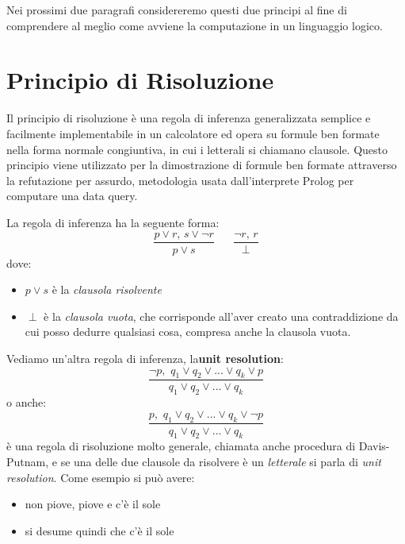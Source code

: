 Nei prossimi due paragrafi considereremo questi due principi al fine di comprendere al meglio come avviene la computazione in un linguaggio logico.
\section{Principio di Risoluzione}
Il principio di risoluzione è una regola di inferenza generalizzata semplice e facilmente implementabile in un calcolatore
ed opera su formule ben formate nella forma normale congiuntiva, in cui i letterali si chiamano clausole.\newline
Questo principio viene utilizzato  per la dimostrazione di formule ben formate attraverso la refutazione per assurdo,
metodologia usata dall'interprete Prolog per computare una data query.

La regola di inferenza ha la seguente forma:
\begin{equation*}
  \frac{p\vee r,\, s\lor \neg r}{p\vee s}\,\,\,\,\,\,\,\,\,\,\frac{\neg r,\, r}{\perp}
\end{equation*}
dove:
\begin{itemize}
\item $p \lor  s$ è la \textit{clausola risolvente}
\item $\perp$ è la \textit{clausola vuota}, che corrisponde all'aver creato una contraddizione da cui posso dedurre qualsiasi cosa,
       compresa anche la clausola vuota.
\end{itemize}
Vediamo un'altra regola di inferenza, la\textbf{unit resolution}:
   \begin{equation*}
     \frac{\neg p,\,\, q_1\vee q_2\vee ... \vee q_k \vee p}{q_1\vee q_2\vee ... \vee q_k}
   \end{equation*}
o anche:
\begin{equation*}
  \frac{p,\,\, q_1\vee q_2\vee ... \vee q_k \vee \neg p}{q_1\vee q_2\vee ... \vee q_k}
\end{equation*}
è una regola di risoluzione molto generale, chiamata anche procedura di Davis-Putnam, e se una delle due clausole da risolvere
è un \textit{letterale} si parla di \emph{unit resolution}.\newline
Come esempio si può avere:
\begin{itemize}
\item non piove, piove e c'è il sole
\item si desume quindi che c'è il sole
\end{itemize}

